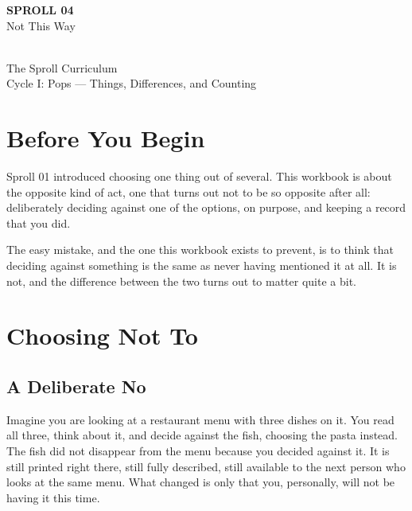 \documentclass[11pt]{book}
\begin{document}
\begin{titlepage}
\centering
\vspace*{1.4in}
{\Huge \textbf{SPROLL 04}}\\[0.5in]
{\huge Not This Way}\\[0.8in]
\\[0.8in]
{\Large The Sproll Curriculum}\\[0.2in]
{\large Cycle I: Pops --- Things, Differences, and Counting}
\end{titlepage}

\tableofcontents

\chapter*{Before You Begin}

Sproll 01 introduced choosing one thing out of several. This workbook is about the opposite kind of act, one that turns out not to be so opposite after all: deliberately deciding against one of the options, on purpose, and keeping a record that you did.

The easy mistake, and the one this workbook exists to prevent, is to think that deciding against something is the same as never having mentioned it at all. It is not, and the difference between the two turns out to matter quite a bit.

\chapter{Choosing Not To}

\section{A Deliberate No}

Imagine you are looking at a restaurant menu with three dishes on it. You read all three, think about it, and decide against the fish, choosing the pasta instead. The fish did not disappear from the menu because you decided against it. It is still printed right there, still fully described, still available to the next person who looks at the same menu. What changed is only that you, personally, will not be having it this time.
\end{document}
